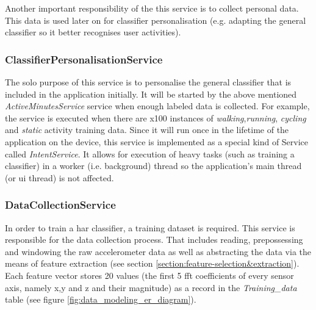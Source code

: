             Another important responsibility of the this service is to collect personal data. This data is used later on for classifier personalisation (e.g. adapting the general classifier so it better recognises user activities).
            
            \subsubsection{ClassifierPersonalisationService}
            The solo purpose of this service is to personalise the general classifier that is included in the application initially. It will be started by the above mentioned \textit{ActiveMinutesService} service when enough labeled data is collected. For example, the service is executed when there are x100 instances of \textit{walking},\textit{running}, \textit{cycling} and \textit{static} activity training data. Since it will run once in the lifetime of the application on the device, this service is implemented as a special kind of Service called \textit{IntentService}. It allows for execution of heavy tasks (such as training a classifier) in a worker (i.e. background) thread so the application's main thread (or \gls{ui} thread) is not affected.
            
            \subsubsection{DataCollectionService}
            \label{section:data_collection_service}
            In order to train a \gls{har} classifier, a training dataset is required. This service is responsible for the data collection process. That includes reading, prepossessing and windowing the raw accelerometer data as well as abstracting the data via the means of feature extraction (see section \ref{section:feature-selection&extraction}). Each feature vector stores 20 values (the first 5 \gls{fft} coefficients of every sensor axis, namely x,y and z and their magnitude) as a record in the \textit{Training\_data} table (see figure \ref{fig:data_modeling_er_diagram}).
            
